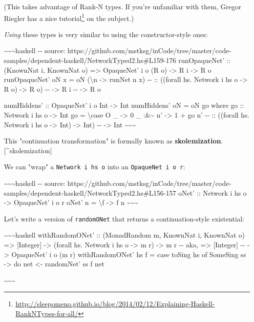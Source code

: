 \documentclass[]{article}
\renewcommand{\href}[2]{#2\footnote{\url{#1}}}
\begin{document}
(This takes advantage of Rank-N types. If you're unfamiliar with them, Gregor
Riegler has a
\href{http://sleepomeno.github.io/blog/2014/02/12/Explaining-Haskell-RankNTypes-for-all/}{nice
tutorial} on the subject.)

\emph{Using} these types is very similar to using the constructor-style ones:

\textasciitilde{}\textasciitilde{}\textasciitilde{}haskell -\/- source:
https://github.com/mstksg/inCode/tree/master/code-samples/dependent-haskell/NetworkTyped2.hs\#L159-176
runOpaqueNet' :: (KnownNat i, KnownNat o) =\textgreater{} OpaqueNet' i o (R o)
-\textgreater{} R i -\textgreater{} R o runOpaqueNet' oN x = oN
(\textbackslash{}n -\textgreater{} runNet n x) -\/- :: ((forall hs. Network i hs
o -\textgreater{} R o) -\textgreater{} R o) -\/- -\textgreater{} R i -\/-
-\textgreater{} R o

numHiddens' :: OpaqueNet' i o Int -\textgreater{} Int numHiddens' oN = oN go
where go :: Network i hs o -\textgreater{} Int go = \textbackslash{}case O \_
-\textgreater{} 0 \_ :\&\textasciitilde{} n' -\textgreater{} 1 + go n' -\/- ::
((forall hs. Network i hs o -\textgreater{} Int) -\textgreater{} Int) -\/-
-\textgreater{} Int \textasciitilde{}\textasciitilde{}\textasciitilde{}

This "continuation transformation" is formally known as
\textbf{skolemization}.{[}\^{}skolemization{]}

We can "wrap" a \texttt{Network\ i\ hs\ o} into an
\texttt{OpaqueNet\textquotesingle{}\ i\ o\ r}:

\textasciitilde{}\textasciitilde{}\textasciitilde{}haskell -\/- source:
https://github.com/mstksg/inCode/tree/master/code-samples/dependent-haskell/NetworkTyped2.hs\#L156-157
oNet' :: Network i hs o -\textgreater{} OpaqueNet' i o r oNet' n =
\textbackslash{}f -\textgreater{} f n
\textasciitilde{}\textasciitilde{}\textasciitilde{}

Let's write a version of \texttt{randomONet} that returns a continuation-style
existential:

\textasciitilde{}\textasciitilde{}\textasciitilde{}haskell withRandomONet' ::
(MonadRandom m, KnownNat i, KnownNat o) =\textgreater{} {[}Integer{]}
-\textgreater{} (forall hs. Network i hs o -\textgreater{} m r) -\textgreater{}
m r -\/- aka, =\textgreater{} {[}Integer{]} -\/- -\textgreater{} OpaqueNet' i o
(m r) withRandomONet' hs f = case toSing hs of SomeSing ss -\textgreater{} do
net \textless{}- randomNet' ss f net

\textasciitilde{}\textasciitilde{}\textasciitilde{}
\end{document}

